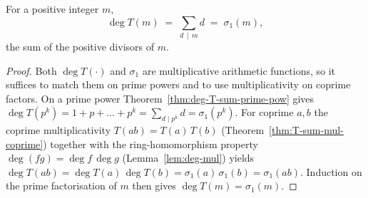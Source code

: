 \begin{theorem}\label{thm:deg-T-sum}
\leanok
For a positive integer $m$,
\[
  \deg T(m) \;=\; \sum_{d\,\mid\, m} d \;=\; \sigma_1(m),
\]
the sum of the positive divisors of $m$.
\end{theorem}

\begin{proof}
\leanok
Both $\deg T(\cdot)$ and $\sigma_1$ are multiplicative arithmetic functions, so it suffices to
match them on prime powers and to use multiplicativity on coprime factors. On a prime power
Theorem~\ref{thm:deg-T-sum-prime-pow} gives $\deg T(p^k)=1+p+\dots+p^k=\sum_{d\mid p^k} d
=\sigma_1(p^k)$. For coprime $a,b$ the coprime multiplicativity $T(ab)=T(a)\,T(b)$
(Theorem~\ref{thm:T-sum-mul-coprime}) together with the ring-homomorphism property
$\deg(fg)=\deg f\,\deg g$ (Lemma~\ref{lem:deg-mul}) yields
$\deg T(ab)=\deg T(a)\,\deg T(b)=\sigma_1(a)\,\sigma_1(b)=\sigma_1(ab)$. Induction on the prime
factorisation of $m$ then gives $\deg T(m)=\sigma_1(m)$.
\end{proof}
